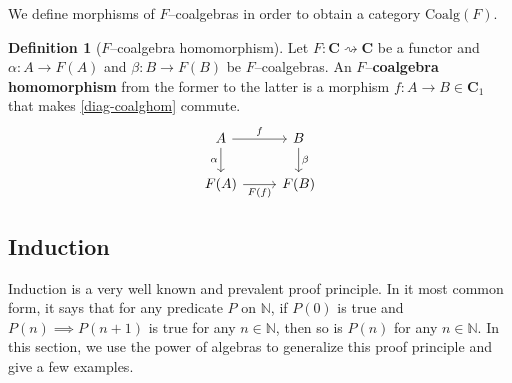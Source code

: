 \documentclass{article}
\theoremstyle{definition}
\newtheorem{defn}[thm]{Definition}
\theoremstyle{remark}
\newcommand{\N}{\mathbb{N}}
\begin{document}
We define morphisms of $F$--coalgebras in order to obtain a category $\text{Coalg}(F)$.
\begin{defn}[$F$--coalgebra homomorphism]
	Let $F:\mathbf{C}\rightsquigarrow \mathbf{C}$ be a functor and $\alpha: A \rightarrow F(A)$ and $\beta:B \rightarrow F(B)$ be $F$--coalgebras. An $F$--\textbf{coalgebra homomorphism} from the former to the latter is a morphism $f:A\rightarrow B \in \mathbf{C}_1$ that makes \eqref{diag-coalghom} commute.
	\begin{equation}\label{diag-coalghom}
		\centering
		\begin{tikzcd}
			A \arrow[r, "f"] \arrow[d, "\alpha"'] & B \arrow[d, "\beta"] \\
			F(A) \arrow[r, "F(f)"']               & F(B)                
		\end{tikzcd}
	\end{equation}
\end{defn}

\subsection{Induction}
Induction is a very well known and prevalent proof principle. In it most common form, it says that for any predicate $P$ on $\N$, if $P(0)$ is true and $P(n) \implies P(n+1)$ is true for any $n \in \N$, then so is $P(n)$ for any $n\in \N$. In this section, we use the power of algebras to generalize this proof principle and give a few examples.
\end{document}
